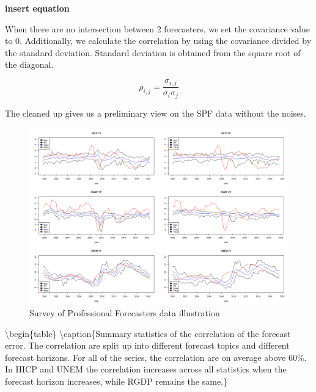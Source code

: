 \documentclass[]{article}
\begin{document}
\textbf{insert equation}

When there are no intersection between 2 forecasters, we set the
covariance value to 0. Additionally, we calculate the correlation by
using the covariance divided by the standard deviation. Standard
deviation is obtained from the square root of the diagonal.

\begin{equation}
\label{eqn: cov2cor}
\rho_{i,j} = \frac{\sigma_{i,j}}{\sigma_{i}\sigma_{j}}
\end{equation}

The cleaned up gives us a preliminary view on the SPF data without the
noises.

\begin{figure}[!h]
\centering
\includegraphics{./Output/Images/SPF.png}
\caption{Survey of Professional Forecasters data illustration}\label{fig: SPF data illustration}
\end{figure}

\textbackslash{}begin\{table\} \centering
\textbackslash{}caption\{Summary statistics of the correlation of the
forecast error. The correlation are split up into different forecast
topics and different forecast horizons. For all of the series, the
correlation are on average above 60\%. In HICP and UNEM the correlation
increases across all statistics when the forecast horizon increases,
while RGDP remains the same.\}
\label{tab: correlation summary statistics}
\end{document}
